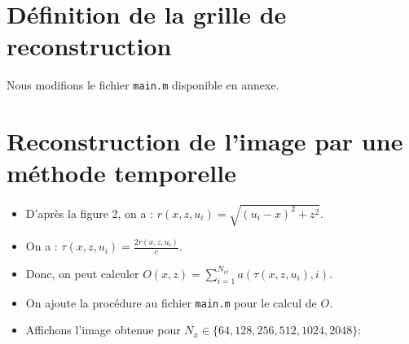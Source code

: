 \documentclass[12pt,a4paper,titlepage]{article}
\begin{document}
\section{Définition de la grille de reconstruction}

Nous modifions le fichier \texttt{main.m} disponible en annexe.

\section{Reconstruction de l'image par une méthode temporelle}

\begin{itemize}
    \item{D'après la figure 2, on a : $r(x,z,u_i) = \sqrt{(u_i - x)^2 + z^2}$.}
    \item{On a : $\tau(x, z, u_i) = \frac{2r(x,z,u_i)}{c}$.}
    \item{Donc, on peut calculer $O(x,z) = \sum_{i=1}^{N_{el}}a(\tau(x, z, u_i),i)$.}
    \item{On ajoute la procédure au fichier \texttt{main.m} pour le calcul de $O$.}
    \item{Affichons l'image obtenue pour $N_x \in \{64,128,256,512,1024,2048\}$:
        }
\end{itemize}
\end{document}
